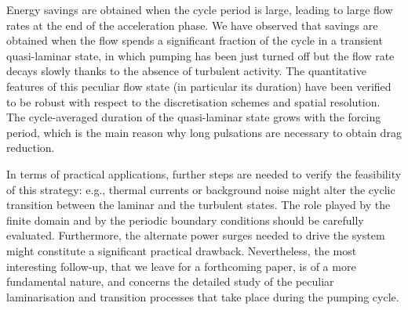 \documentclass[lineno]{jfm}
\begin{document}
Energy savings are obtained when the cycle period is large, leading to large flow rates at the end of the acceleration phase. 
We have observed that savings are obtained when the flow spends a significant fraction of the cycle in a transient quasi-laminar state, in which pumping has been just turned off but the flow rate decays slowly thanks to the absence of turbulent activity. 
The quantitative features of this peculiar flow state (in particular its duration) have been verified to be robust with respect to the discretisation schemes and spatial resolution. The cycle-averaged duration of the quasi-laminar state grows with the forcing period, which is the main reason why long pulsations are necessary to obtain drag reduction.

In terms of practical applications, further steps are needed to verify the feasibility of this strategy: e.g., thermal currents or background noise might alter the cyclic transition between the laminar and the turbulent states. 
The role played by the finite domain and by the periodic boundary conditions should be carefully evaluated. 
Furthermore, the alternate power surges needed to drive the system might constitute a significant practical drawback.
Nevertheless, the most interesting follow-up, that we leave for a forthcoming paper, is of a more fundamental nature, and concerns the detailed study of the peculiar laminarisation and transition processes that take place during the pumping cycle. 



\end{document}
